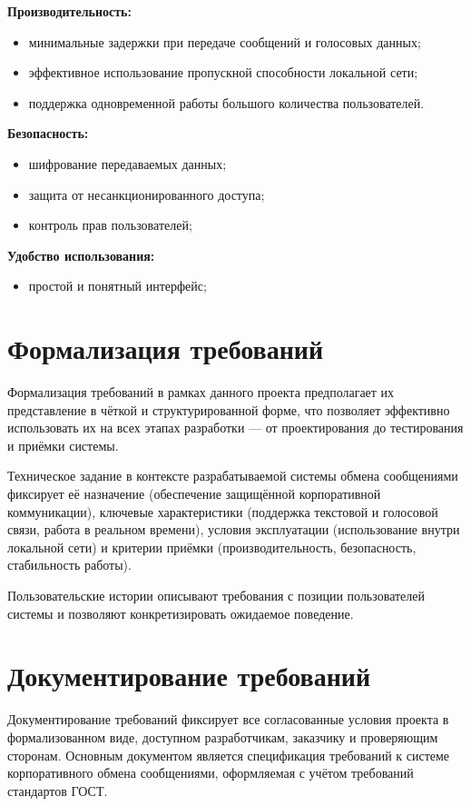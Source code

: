 \documentclass[14pt,a4paper]{extarticle}
\begin{document}
\textbf{Производительность:}
\begin{itemize}
    \item минимальные задержки при передаче сообщений и голосовых данных;
    \item эффективное использование пропускной способности локальной сети;
    \item поддержка одновременной работы большого количества пользователей.
\end{itemize}

\textbf{Безопасность:}
\begin{itemize}
    \item шифрование передаваемых данных;
    \item защита от несанкционированного доступа;
    \item контроль прав пользователей;
\end{itemize}

\textbf{Удобство использования:}
\begin{itemize}
    \item простой и понятный интерфейс;
\end{itemize}

\section{Формализация требований}

Формализация требований в рамках данного проекта предполагает их представление в чёткой и структурированной форме, что позволяет эффективно использовать их на всех этапах разработки — от проектирования до тестирования и приёмки системы.

Техническое задание в контексте разрабатываемой системы обмена сообщениями фиксирует её назначение (обеспечение защищённой корпоративной коммуникации), ключевые характеристики (поддержка текстовой и голосовой связи, работа в реальном времени), условия эксплуатации (использование внутри локальной сети) и критерии приёмки (производительность, безопасность, стабильность работы).

Пользовательские истории описывают требования с позиции пользователей системы и позволяют конкретизировать ожидаемое поведение.

\section{Документирование требований}

Документирование требований фиксирует все согласованные условия проекта в формализованном виде, доступном разработчикам, заказчику и проверяющим сторонам. Основным документом является спецификация требований к системе корпоративного обмена сообщениями, оформляемая с учётом требований стандартов ГОСТ.
\end{document}
